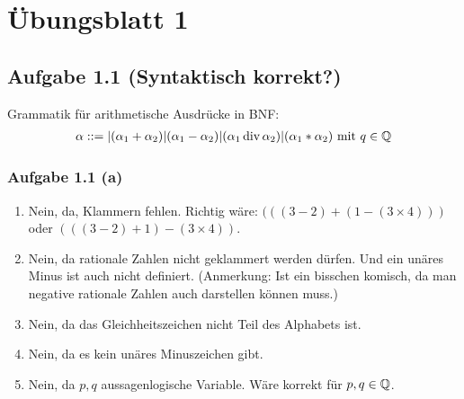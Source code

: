 
\section{Übungsblatt 1}

\subsection{Aufgabe 1.1 (Syntaktisch korrekt?)}
Grammatik für arithmetische Ausdrücke in BNF:
\begin{align*}
	\alpha::=|(\alpha_1+\alpha_2)|(\alpha_1-\alpha_2)|(\alpha_1\operatorname{div}\alpha_2)|(\alpha_1\ast\alpha_2)\text{ mit } q\in\mathbb{Q}
\end{align*}

\subsubsection{Aufgabe 1.1 (a)}
\begin{enumerate}[label=(\arabic*)]
	\item Nein, da, Klammern fehlen. Richtig wäre: $(((3-2)+(1-(3\times 4)))$ oder $(((3-2)+1)-(3\times 4))$.
	\item Nein, da rationale Zahlen nicht geklammert werden dürfen. Und ein unäres Minus ist auch nicht definiert. 
	(Anmerkung: Ist ein bisschen komisch, da man negative rationale Zahlen auch darstellen können muss.)
	\item Nein, da das Gleichheitszeichen nicht Teil des Alphabets ist.
	\item Nein, da es kein unäres Minuszeichen gibt.
	\item Nein, da $p,q$ aussagenlogische Variable. Wäre korrekt für $p,q\in\mathbb{Q}$.
\end{enumerate}

